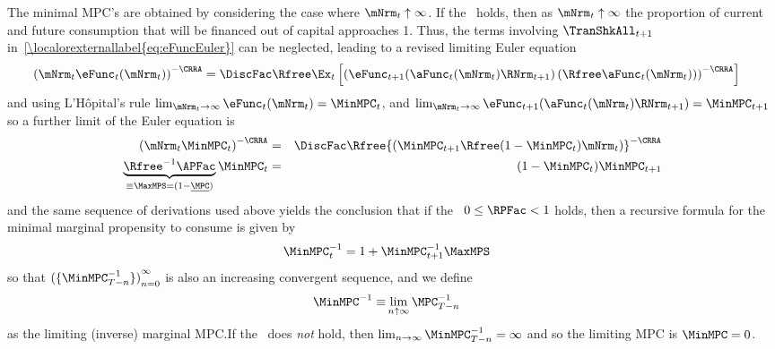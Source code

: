 \documentclass[\econtexRoot/BufferStockTheory]{subfiles}
\begin{document}
The minimal MPC's are obtained by considering the case where $\mNrm_{t} \uparrow \infty$.  If the \FHWC~holds, then as $\mNrm_{t} \uparrow \infty$ the proportion of current and future consumption that will be financed out of capital approaches 1.  Thus, the terms involving $\TranShkAll_{t+1}$ in~\eqref{\localorexternallabel{eq:eFuncEuler}} can be neglected, leading to a revised limiting Euler equation
\begin{eqnarray*}
 {({\mNrm_{t}}\eFunc_{t}(\mNrm_{t}))}^{-\CRRA}  & = \DiscFac \Rfree \Ex_{t}\left[{\left(\eFunc_{t+1}(\aFunc_{t}(\mNrm_{t})\RNrm_{t+1})\left({\Rfree \aFunc_{t}(\mNrm_{t})}\right)\right)}^{-\CRRA}\right]
\end{eqnarray*}
and using L'H\^opital's rule $\lim_{\mNrm_{t} \rightarrow \infty} \eFunc_{t}(\mNrm_{t}) = \MinMPC_{t}$, and $\lim_{\mNrm_{t} \rightarrow \infty} \eFunc_{t+1}(\aFunc_{t}(\mNrm_{t})\RNrm_{t+1}) = \MinMPC_{t+1}$ so a further limit of the Euler equation is\hypertarget{MPCnvrs}{}
\begin{eqnarray*}
  {(\mNrm_{t}\MinMPC_{t})}^{-\CRRA}  & = & \DiscFac \Rfree {\left(\MinMPC_{t+1} \Rfree (1-\MinMPC_{t})\mNrm_{t}\right)}^{-\CRRA}
\\ \underbrace{{\Rfree}^{-1}{\APFac}}_{\equiv \MaxMPS = (1-\underline{\MPC})} \MinMPC_{t}  & = & (1-\MinMPC_{t}) \MinMPC_{t+1}
\end{eqnarray*}
and the same sequence of derivations used above yields the conclusion
that if the \RIC~$0 \leq \RPFac < 1$ holds, then a recursive formula for the
minimal marginal propensity to consume is given by
\begin{equation}\begin{gathered}\begin{aligned}
 \MinMPC_{t}^{-1}  & = 1+\MinMPC_{t+1}^{-1}\MaxMPS  \label{eq:MinMPCInvApndx}
\end{aligned}\end{gathered}\end{equation}
so that ${(\{\MinMPC_{T-n}^{-1}\})}_{n=0}^{\infty}$ is also an increasing
convergent sequence, and we define
\begin{equation}\begin{gathered}\begin{aligned}
\MinMPC^{-1} \equiv &\lim_{n \uparrow \infty} \MPC_{T-n}^{-1}  
\end{aligned}\end{gathered}\end{equation}
as the limiting (inverse) marginal MPC.\@  If the \RIC~does \textit{not} hold, then $\lim_{n \rightarrow \infty} \MinMPC_{T-n}^{-1} = \infty$
and so the limiting MPC is $\MinMPC = 0$.
\end{document}
